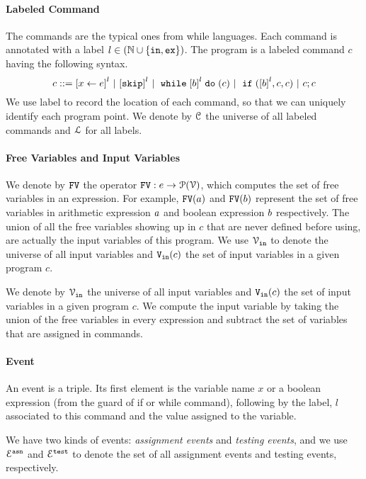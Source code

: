 \paragraph{Labeled Command}
The commands are the typical ones from while languages. Each command is annotated with a label $l \in (\mathbb{N} \cup \{\mathtt{in}, \mathtt{ex}\})$. The program is a labeled command $c$ having the following syntax. 
\[
{c} ::= 
\clabel{\assign{x}{\expr}}^l 
~|~  \clabel{\eskip}^l
~|~ \ewhile \clabel{\bexpr}^{l} \edo ({c})
~|~ \eif(\clabel{\bexpr}^{l} , {c}, {c}) 
~|~ {c};{c} 
\]
We use label to record
the location of each command, so that we can uniquely identify each program point.
We denote by $\mathcal{C}$ the universe of all labeled commands and $\mathcal{L}$ for all labels.

\paragraph{Free Variables and Input Variables}
  We denote by $\mathtt{FV}$ the operator $\mathtt{FV}: e \to \mathcal{P}(\mathcal{V})$, which computes the set of free variables in an expression. For example,
  $\mathtt{FV}(a)$ and $\mathtt{FV}(b)$ represent the set of free variables in arithmetic
  expression $a$ and boolean expression $b$ respectively.
  The union of all the free variables
  showing up in $c$ that are never defined before using, are actually the input variables of this program.
  We use $\mathcal{V}_{\mathtt{in}}$ to denote the universe of all input variables and $\mathtt{V_{\mathtt{in}}}(c)$ the set of input variables in a given program $c$.

  We denote by $\mathcal{V}_{\mathtt{\mathtt{in}}}$ the universe of all input variables and $\mathtt{V_{\mathtt{in}}}(c)$ the set of input variables in a given program $c$.
  We compute the input variable by taking the union of the free variables in every expression
  and subtract the set of variables that are assigned in commands.
  
\paragraph{Event}
An event is a triple.
Its first element is the variable name $x$
or a boolean expression (from the guard of if or while command), 
following by 
 the label, $l$ associated to this command and the value assigned to the variable.

 We have two kinds of events: \emph{assignment events} and \emph{testing events},
 and we use $\mathcal{E}^{\mathtt{{asn}}}$ and $\mathcal{E}^{\mathtt{{test}}}$ to denote the set of all assignment events and testing events, respectively.

